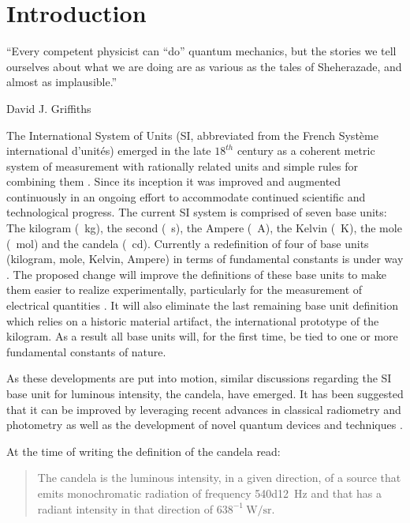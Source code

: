 

\chapter{Introduction}	\label{ch::introduction}

		\epigraph{``Every competent physicist can \enquote{do} quantum mechanics, but the stories we tell ourselves about what we are doing are as various as the tales of Sheherazade, and almost as implausible.''}{\textup{David J. Griffiths}}

		The International System of Units (SI, abbreviated from the French Syst\`eme international d'unit\'es) emerged in the late $18^{th}$ century as a coherent metric system of measurement with rationally related units and simple rules for combining them \cite{SIbrochure}. Since its inception it was improved and augmented continuously in an ongoing effort to accommodate continued scientific and technological progress. The current SI system is comprised of seven base units: The kilogram (\SI{}{\kg}), the second (\SI{}{\s}), the Ampere (\SI{}{\ampere}), the Kelvin (\SI{}{\kelvin}), the mole (\SI{}{\mole}) and the candela (\SI{}{\candela}). Currently a redefinition of four of base units (kilogram, mole, Kelvin, Ampere) in terms of fundamental constants is under way \cite{0026-1394-44-1-010, SIHighlights2017}. The proposed change will improve the definitions of these base units to make them easier to realize experimentally, particularly for the measurement of electrical quantities \cite{zwinkels2010photometry}. It will also eliminate the last remaining base unit definition which relies on a historic material artifact, the international prototype of the kilogram. As a result all base units will, for the first time, be tied to one or more fundamental constants of nature.

		As these developments are put into motion, similar discussions regarding the SI base unit for luminous intensity, the candela, have emerged. It has been suggested that it can be improved by leveraging recent advances in classical radiometry and photometry as well as the development of novel quantum devices and techniques \cite{Cheung2007}.

		At the time of writing the definition of the candela read:

		\begin{quote}
			The candela is the luminous intensity, in a given direction, of a source that emits monochromatic radiation of frequency \SI{540d12}{\hertz} and that has a radiant intensity in that direction of $638^{-1} \SI{}{\watt\per\steradian}$.
		\end{quote}

